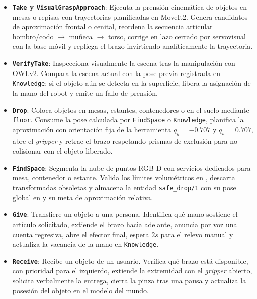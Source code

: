 \begin{itemize}
    \item \textbf{\texttt{Take} y \texttt{VisualGraspApproach}}: Ejecuta la prensión cinemática de objetos en mesas o repisas con trayectorias planificadas en MoveIt2. Genera candidatos de aproximación frontal o cenital, reordena la secuencia articular hombro/codo $\to$ muñeca $\to$ torso, corrige en lazo cerrado por servovisual con la base móvil y repliega el brazo invirtiendo analíticamente la trayectoria.

    \item \textbf{\texttt{VerifyTake}}: Inspecciona visualmente la escena tras la manipulación con OWLv2. Compara la escena actual con la pose previa registrada en \texttt{Knowledge}; si el objeto aún se detecta en la superficie, libera la asignación de la mano del robot y emite un fallo de prensión.

    \item \textbf{\texttt{Drop}}: Coloca objetos en mesas, estantes, contenedores o en el suelo mediante \texttt{floor}. Consume la pose calculada por \texttt{FindSpace} o \texttt{Knowledge}, planifica la aproximación con orientación fija de la herramienta $q_y = -0.707$ y $q_w = 0.707$, abre el \textit{gripper} y retrae el brazo respetando prismas de exclusión para no colisionar con el objeto liberado.

    \item \textbf{\texttt{FindSpace}}: Segmenta la nube de puntos RGB-D con servicios dedicados para mesa, contenedor o estante. Valida los límites volumétricos en , descarta transformadas obsoletas y almacena la entidad \texttt{safe\_drop/1} con su pose global en  y su meta de aproximación relativa.

    \item \textbf{\texttt{Give}}: Transfiere un objeto a una persona. Identifica qué mano sostiene el artículo solicitado, extiende el brazo hacia adelante, anuncia por voz una cuenta regresiva, abre el efector final, espera $2s$ para el relevo manual y actualiza la vacancia de la mano en \texttt{Knowledge}.

    \item \textbf{\texttt{Receive}}: Recibe un objeto de un usuario. Verifica qué brazo está disponible, con prioridad para el izquierdo, extiende la extremidad con el \textit{gripper} abierto, solicita verbalmente la entrega, cierra la pinza tras una pausa y actualiza la posesión del objeto en el modelo del mundo.


\end{itemize}
